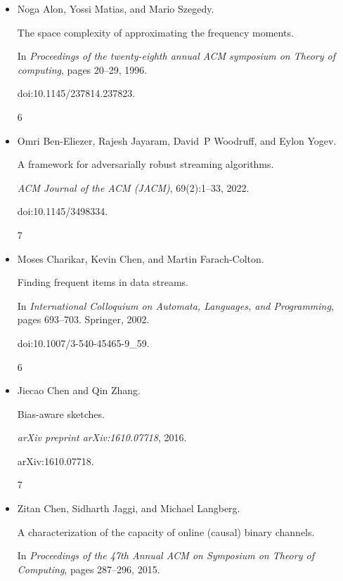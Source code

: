 \begin{itemize}


\item[] 
[1]

Noga Alon, Yossi Matias, and Mario Szegedy.


The space complexity of approximating the frequency moments.


In \emph{Proceedings of the twenty-eighth annual ACM symposium on
Theory of computing}, pages 20–29, 1996.


doi:10.1145/237814.237823.


6




\item[] 
[2]

Omri Ben-Eliezer, Rajesh Jayaram, David P Woodruff, and Eylon Yogev.


A framework for adversarially robust streaming algorithms.


\emph{ACM Journal of the ACM (JACM)}, 69(2):1–33, 2022.


doi:10.1145/3498334.


7




\item[] 
[3]

Moses Charikar, Kevin Chen, and Martin Farach-Colton.


Finding frequent items in data streams.


In \emph{International Colloquium on Automata, Languages, and
Programming}, pages 693–703. Springer, 2002.


doi:10.1007/3-540-45465-9\_59.


6




\item[] 
[4]

Jiecao Chen and Qin Zhang.


Bias-aware sketches.


\emph{arXiv preprint arXiv:1610.07718}, 2016.


arXiv:1610.07718.


7




\item[] 
[5]

Zitan Chen, Sidharth Jaggi, and Michael Langberg.


A characterization of the capacity of online (causal) binary
channels.


In \emph{Proceedings of the 47th Annual ACM on Symposium on Theory
of Computing}, pages 287–296, 2015.



\end{itemize}
